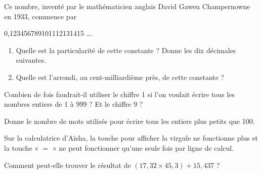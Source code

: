 \begin{enigme}

Ce nombre, inventé par le mathématicien anglais David Gawen Champernowne en 1933, commence par

0,123456789101112131415 \ldots . \\[-1em]
\begin{enumerate}
 \item Quelle est la particularité de cette constante ? Donne les dix décimales suivantes.
 \item Quelle est l'arrondi, au cent-milliardième près, de cette constante ?
 \end{enumerate}
 \end{enigme}
        
\vspace*{2em}
        
\begin{enigme}[Défis]
Combien de fois faudrait-il utiliser le chiffre 1 si l'on voulait écrire tous les nombres entiers de 1 à 999 ? Et le chiffre 9 ?

Donne le nombre de mots utilisés pour écrire tous les entiers plus petits que 100.
 \end{enigme} 
 
 \vspace*{2em}

\begin{enigme}
Sur la calculatrice d'Aïsha, la touche pour afficher la virgule ne fonctionne plus et la touche « $=$ » ne peut fonctionner qu'une seule fois par ligne de calcul.

Comment peut‑elle trouver le résultat de $(17,32 \times 45,3) + 15,437$ ?
 \end{enigme} 
 
 \vspace*{2em}

